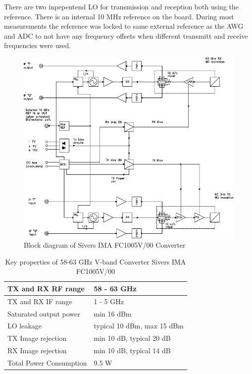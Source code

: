 There are two inpepentend \gls{LO} for transmission and reception both using
the reference. There is an internal 10 MHz reference on the board. During
most measurements the reference was locked to same external reference as the
\gls{AWG} and \gls{ADC} to not have any frequency offsets when different
transmitt and receive frequencies were used.

\begin{figure}
  \centering
  \includegraphics[width=\textwidth]{figures/sivers_block_diagram}
  \caption{Block diagram of Sivers IMA FC1005V/00 Converter}
  \label{fig:sivers}
\end{figure}

\begin{table}[h]
  \centering
  \begin{tabular}{|l|l|}
    \hline
    \acrshort{TX} and \acrshort{RX} \gls{RF} range & 58 - 63 GHz \\ \hline
    \acrshort{TX} and \acrshort{RX} \gls{IF} range & 1 - 5 GHz \\ \hline
    Saturated output power & min 16 dBm \\ \hline
    \gls{LO} leakage & typical 10 dBm, max 15 dBm \\ \hline
    \acrshort{TX} Image rejection & min 10 dB, typical 20 dB \\ \hline
    \acrshort{RX} Image rejection & min 10 dB, typical 14 dB \\ \hline
    Total Power Consumption & 9.5 W \\ \hline
  \end{tabular}
  \caption{Key properties of 58-63 GHz V-band Converter Sivers IMA FC1005V/00}
  \label{tab:awg}
\end{table}

